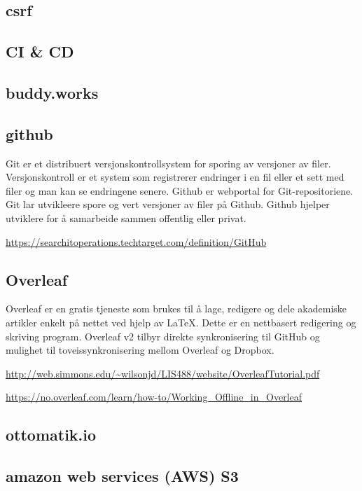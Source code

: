 \subsection{csrf}

\subsection{CI \& CD}

\subsection{buddy.works}

\subsection{github}
 Git er et distribuert versjonskontrollsystem for sporing av versjoner av filer. Versjonskontroll er et system som registrerer endringer i en fil eller et sett med filer og man kan se endringene senere. Github er webportal for Git-repositoriene. Git lar utvikleere spore og vert versjoner av filer på Github. Github hjelper utviklere for å samarbeide sammen offentlig eller privat.
 
 \url{https://searchitoperations.techtarget.com/definition/GitHub}
 
\subsection{Overleaf}
Overleaf er en gratis tjeneste som brukes til å lage, redigere og dele akademiske artikler enkelt på nettet ved hjelp av LaTeX. Dette er en nettbasert redigering og skriving program. 
Overleaf v2 tilbyr direkte synkronisering til GitHub og mulighet til toveissynkronisering mellom Overleaf og Dropbox.

\url{http://web.simmons.edu/~wilsonjd/LIS488/website/OverleafTutorial.pdf}

\url{https://no.overleaf.com/learn/how-to/Working_Offline_in_Overleaf}

\subsection{ottomatik.io}

\subsection{amazon web services (AWS) S3}

